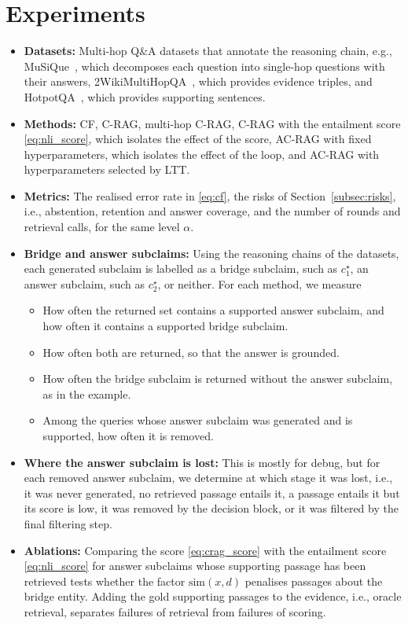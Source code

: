 \section{Experiments}\label{sec:experiments}
 
\begin{itemize}[leftmargin=*]
  \item \textbf{Datasets:} Multi-hop Q\&A datasets that annotate the reasoning chain, e.g., MuSiQue~\cite{trivedi2022musique}, which decomposes each question into single-hop questions with their answers, 2WikiMultiHopQA~\cite{ho2020constructing}, which provides evidence triples, and HotpotQA~\cite{yang2018hotpotqa}, which provides supporting sentences.
  \item \textbf{Methods:} CF, C-RAG, multi-hop C-RAG, C-RAG with the entailment score \eqref{eq:nli_score}, which isolates the effect of the score, AC-RAG with fixed hyperparameters, which isolates the effect of the loop, and AC-RAG with hyperparameters selected by LTT.
  \item \textbf{Metrics:} The realised error rate in \eqref{eq:cf}, the risks of Section~\ref{subsec:risks}, i.e., abstention, retention and answer coverage, and the number of rounds and retrieval calls, for the same level $\alpha$.
  \item \textbf{Bridge and answer subclaims:} Using the reasoning chains of the datasets, each generated subclaim is labelled as a bridge subclaim, such as $c^{\star}_1$, an answer subclaim, such as $c^{\star}_2$, or neither. For each method, we measure
  \begin{itemize}
    \item How often the returned set contains a supported answer subclaim, and how often it contains a supported bridge subclaim.
    \item How often both are returned, so that the answer is grounded.
    \item How often the bridge subclaim is returned without the answer subclaim, as in the example.
    \item Among the queries whose answer subclaim was generated and is supported, how often it is removed.
  \end{itemize}
  \item \textbf{Where the answer subclaim is lost:} This is mostly for debug, but for each removed answer subclaim, we determine at which stage it was lost, i.e., it was never generated, no retrieved passage entails it, a passage entails it but its score is low, it was removed by the decision block, or it was filtered by the final filtering step.
  \item \textbf{Ablations:} Comparing the score \eqref{eq:crag_score} with the entailment score \eqref{eq:nli_score} for answer subclaims whose supporting passage has been retrieved tests whether the factor $\mathrm{sim}(x, d)$ penalises passages about the bridge entity. Adding the gold supporting passages to the evidence, i.e., oracle retrieval, separates failures of retrieval from failures of scoring.
\end{itemize}
